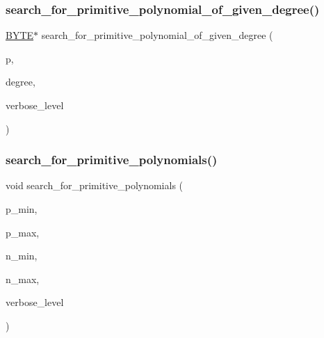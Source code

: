 \subsubsection{\texorpdfstring{search\+\_\+for\+\_\+primitive\+\_\+polynomial\+\_\+of\+\_\+given\+\_\+degree()}{search\_for\_primitive\_polynomial\_of\_given\_degree()}}
{\footnotesize\ttfamily \mbox{\hyperlink{galois_8h_ab6cc7b4aeb6ea31aba2b3fbfc83ff5e6}{B\+Y\+TE}}$\ast$ search\+\_\+for\+\_\+primitive\+\_\+polynomial\+\_\+of\+\_\+given\+\_\+degree (\begin{DoxyParamCaption}\item[{\mbox{\hyperlink{galois_8h_a09fddde158a3a20bd2dcadb609de11dc}{I\+NT}}}]{p,  }\item[{\mbox{\hyperlink{galois_8h_a09fddde158a3a20bd2dcadb609de11dc}{I\+NT}}}]{degree,  }\item[{\mbox{\hyperlink{galois_8h_a09fddde158a3a20bd2dcadb609de11dc}{I\+NT}}}]{verbose\+\_\+level }\end{DoxyParamCaption})}

\mbox{\label{galois__global_8_c_af553fd9220b115eb70f5557cdd6932ac}} 
\subsubsection{\texorpdfstring{search\+\_\+for\+\_\+primitive\+\_\+polynomials()}{search\_for\_primitive\_polynomials()}}
{\footnotesize\ttfamily void search\+\_\+for\+\_\+primitive\+\_\+polynomials (\begin{DoxyParamCaption}\item[{\mbox{\hyperlink{galois_8h_a09fddde158a3a20bd2dcadb609de11dc}{I\+NT}}}]{p\+\_\+min,  }\item[{\mbox{\hyperlink{galois_8h_a09fddde158a3a20bd2dcadb609de11dc}{I\+NT}}}]{p\+\_\+max,  }\item[{\mbox{\hyperlink{galois_8h_a09fddde158a3a20bd2dcadb609de11dc}{I\+NT}}}]{n\+\_\+min,  }\item[{\mbox{\hyperlink{galois_8h_a09fddde158a3a20bd2dcadb609de11dc}{I\+NT}}}]{n\+\_\+max,  }\item[{\mbox{\hyperlink{galois_8h_a09fddde158a3a20bd2dcadb609de11dc}{I\+NT}}}]{verbose\+\_\+level }\end{DoxyParamCaption})}

